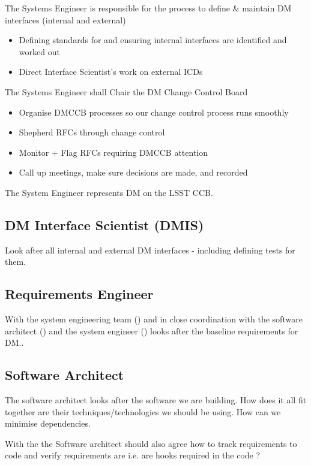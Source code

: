 The Systems Engineer is responsible for the process to define \& maintain DM interfaces (internal and external) 
\begin{itemize}
\item Defining standards for and ensuring internal interfaces are identified and worked out
\item Direct Interface Scientist's work on external ICDs
\end{itemize}

The Systems Engineer shall Chair the DM Change Control Board 
\begin{itemize}
\item Organise DMCCB  processes so our change control process runs smoothly
\item Shepherd RFCs through change control
\item Monitor + Flag RFCs requiring DMCCB  attention
\item Call up meetings, make sure decisions are made, and recorded
\end{itemize}

The System Engineer represents DM on the LSST CCB.

\subsection{DM Interface Scientist (DMIS) \label{role:dmis}}
Look after all internal and external DM interfaces - including defining tests for them. 

\subsection{Requirements Engineer \label{role:reqeng}}
With the system engineering team () and in close coordination with the software architect () and the system engineer () looks after the baseline requirements for DM.. 




\subsection{Software Architect \label{role:softarc}}
The software architect looks after the software we are building. How does it all fit together are their techniques/technologies we should be using. How can we minimise dependencies. 

With the  the Software architect should also agree how to track requirements to code and verify requirements are i.e. are hooks required in the code ?

